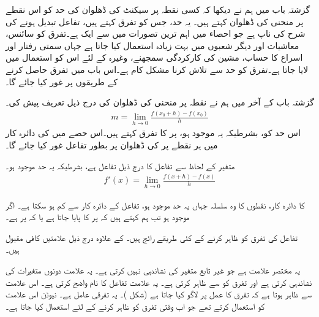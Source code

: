 گزشتہ باب میں ہم نے دیکھا کہ کسی نقطہ پر سیکنٹ کی ڈھلوان کی حد کو اس نقطے پر منحنی کی ڈھلوان کہتے ہیں۔ یہ حد، جس کو تفرق کہتے ہیں، تفاعل تبدیل ہونے کی شرح کی ناپ ہے جو احصاء میں اہم ترین تصورات میں سے ایک ہے۔تفرق کو سائنس، معاشیات اور دیگر شعبوں میں بہت زیادہ استعمال کیا جاتا ہے جہاں سمتی رفتار اور اسراع کا حساب، مشین کی کارکردگی سمجھنے، وغیرہ کے لئے اس کو استعمال میں لایا جاتا ہے۔تفرق کو حد سے تلاش کرنا مشکل کام ہے۔اس باب میں تفرق حاصل کرنے کے طریقوں پر غور کیا جائے گا۔ 

گزشتہ باب کے آخر میں ہم نے نقطہ  پر منحنی  کی ڈھلوان  کی درج ذیل تعریف پیش کی۔
\begin{align*}
m=\lim_{h\to 0}\frac{f(x_0+h)-f(x_0)}{h}
\end{align*} 
اس حد کو، بشرطیکہ یہ موجود ہو،  پر  کا تفرق کہتے ہیں۔اس حصے میں  کی دائرہ کار میں ہر نقطے پر  کی ڈھلوان پر  بطور تفاعل غور کیا جائے گا۔

متغیر  کے لحاظ سے تفاعل  کا  درج ذیل  تفاعل  ہے، بشرطیکہ یہ حد موجود ہو۔
\begin{align*}
f'(x)=\lim_{h\to 0}\frac{f(x+h)-f(x)}{h}
\end{align*}

 کا دائرہ کار، نقطوں کا وہ سلسلہ جہاں یہ حد موجود ہو، تفاعل  کے دائرہ کار سے کم ہو سکتا ہے۔ اگر  موجود ہو تب ہم کہتے ہیں کہ  پر  کا  پایا جاتا ہے یا کہ  پر   ہے۔

تفاعل  کی تفرق کو ظاہر کرنے کے کئی طریقے رائج ہیں۔ کے علاوہ درج ذیل علامتیں کافی مقبول ہیں۔
\begin{description}
یہ مختصر علامت ہے جو غیر تابع متغیر کی نشاندہی نہیں کرتی ہے۔
یہ علامت دونوں متغیرات کی نشاندہی کرتی ہے اور تفرق کو  سے ظاہر کرتی ہے۔  
یہ علامت تفاعل کا نام واضح کرتی ہے۔
اس علامت سے ظاہر ہوتا ہے کہ تفرق کا عمل  پر لاگو کیا جاتا ہے (شکل )۔
یہ تفرقی عامل ہے۔
نیوٹن اس علامت کو استعمال کرتے تھے جو اب وقتی تفرق کو ظاہر کرنے کے لئے استعمال کیا جاتا ہے۔
\end{description} 

